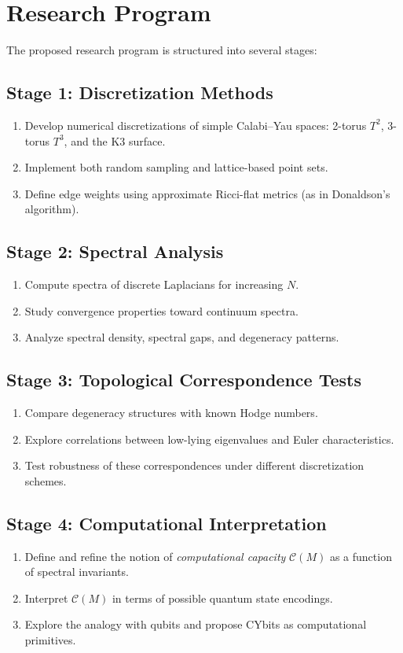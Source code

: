 \documentclass[12pt,a4paper]{article}
\begin{document}
\section{Research Program}
The proposed research program is structured into several stages:

\subsection{Stage 1: Discretization Methods}
\begin{enumerate}
\item Develop numerical discretizations of simple Calabi--Yau spaces: 
2-torus $T^2$, 3-torus $T^3$, and the K3 surface.  
\item Implement both random sampling and lattice-based point sets.  
\item Define edge weights using approximate Ricci-flat metrics 
(as in Donaldson’s algorithm).  
\end{enumerate}

\subsection{Stage 2: Spectral Analysis}
\begin{enumerate}
\item Compute spectra of discrete Laplacians for increasing $N$.  
\item Study convergence properties toward continuum spectra.  
\item Analyze spectral density, spectral gaps, and degeneracy patterns.  
\end{enumerate}

\subsection{Stage 3: Topological Correspondence Tests}
\begin{enumerate}
\item Compare degeneracy structures with known Hodge numbers.  
\item Explore correlations between low-lying eigenvalues 
and Euler characteristics.  
\item Test robustness of these correspondences 
under different discretization schemes.  
\end{enumerate}

\subsection{Stage 4: Computational Interpretation}
\begin{enumerate}
\item Define and refine the notion of \emph{computational capacity} $\mathcal{C}(M)$ 
as a function of spectral invariants.  
\item Interpret $\mathcal{C}(M)$ in terms of possible quantum state encodings.  
\item Explore the analogy with qubits and propose CYbits 
as computational primitives.  
\end{enumerate}
\end{document}

